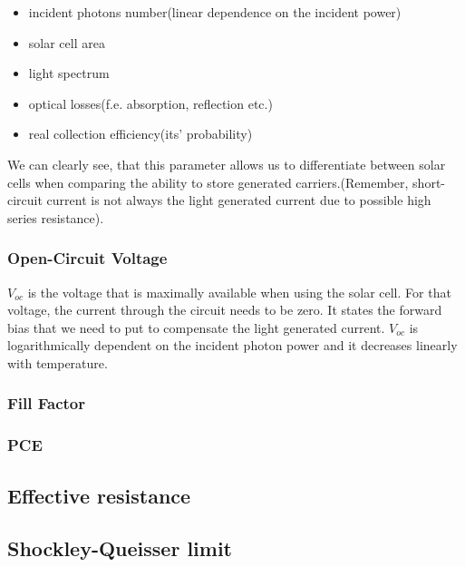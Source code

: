 \begin{itemize}
\item incident photons number(linear dependence on the incident power)
\item solar cell area
\item light spectrum
\item optical losses(f.e. absorption, reflection etc.)
\item real collection efficiency(its' probability)
\end{itemize}

We can clearly see, that this parameter allows us to differentiate between solar cells when comparing the ability to store generated carriers.(Remember, short-circuit current is not always the light generated current due to possible high series resistance).

\subsubsection{Open-Circuit Voltage}

$V_{oc}$ is the voltage that is maximally available when using the solar cell. For that voltage, the current through the circuit needs to be zero. It states the forward bias that we need to put to compensate the light generated current. $V_{oc}$ is logarithmically dependent on the incident photon power and it decreases linearly with temperature. 

\subsubsection{Fill Factor}

\subsubsection{PCE}

\subsection{Effective resistance}

\subsection{Shockley-Queisser limit}